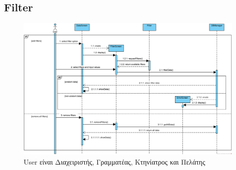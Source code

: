 \documentclass[12pt,a4paper,twoside]{book}
\begin{document}
\subsection{Filter}
\begin{figure}[H]
    \centering
    \includegraphics[width=\textwidth]{Resources/Sequence Diagram/filter_sd.png}
    \caption{User είναι Διαχειριστής, Γραμματέας, Κτηνίατρος και Πελάτης}\label{fig:sequence-filter}
\end{figure}
\end{document}
